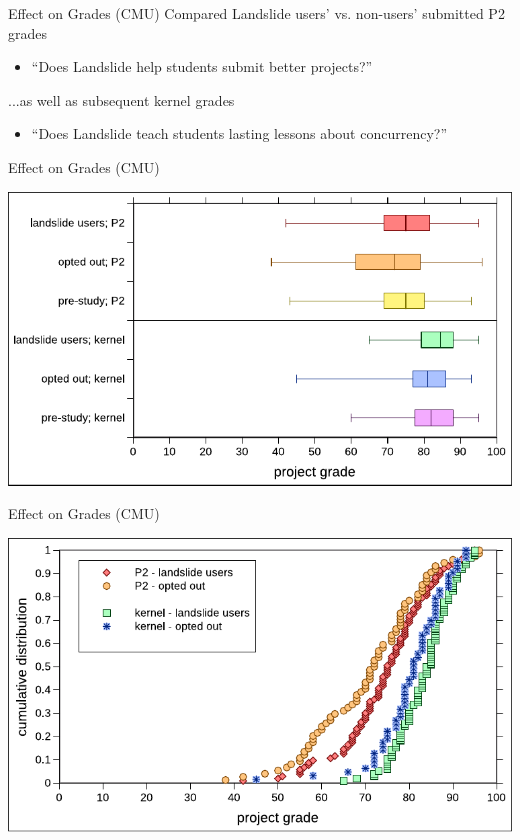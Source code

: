 \documentclass[xcolor=dvipsnames]{beamer}
\begin{document}
\begin{frame}{Effect on Grades (CMU)}
	Compared Landslide users' vs. non-users' submitted P2 grades
	\begin{itemize}
		\item ``Does Landslide help students submit better projects?''
	\end{itemize}
	\linegap

	...as well as subsequent kernel grades
	\begin{itemize}
		\item ``Does Landslide teach students lasting lessons about concurrency?''
	\end{itemize}
\end{frame}

\begin{frame}{Effect on Grades (CMU)}
	\begin{center}
		\includegraphics[width=\textwidth]{../photo-of-ze-studence.pdf}
	\end{center}
\end{frame}
\begin{frame}{Effect on Grades (CMU)} %
	\begin{center}
		\includegraphics[width=\textwidth]{photo-of-ze-studence-cdf-no-pre-study.pdf}
	\end{center}
\end{frame}
\end{document}
